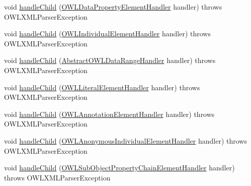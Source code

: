 \begin{DoxyCompactItemize}
\item 
void \hyperlink{interfaceorg_1_1coode_1_1owlapi_1_1owlxmlparser_1_1_o_w_l_element_handler_3_01_o_01_4_a2687058ae777468f56b4913be346c39a}{handle\-Child} (\hyperlink{classorg_1_1coode_1_1owlapi_1_1owlxmlparser_1_1_o_w_l_data_property_element_handler}{O\-W\-L\-Data\-Property\-Element\-Handler} handler)  throws O\-W\-L\-X\-M\-L\-Parser\-Exception
\item 
void \hyperlink{interfaceorg_1_1coode_1_1owlapi_1_1owlxmlparser_1_1_o_w_l_element_handler_3_01_o_01_4_ab55fbdf434382af884e015cf8f259cb0}{handle\-Child} (\hyperlink{classorg_1_1coode_1_1owlapi_1_1owlxmlparser_1_1_o_w_l_individual_element_handler}{O\-W\-L\-Individual\-Element\-Handler} handler)  throws O\-W\-L\-X\-M\-L\-Parser\-Exception
\item 
void \hyperlink{interfaceorg_1_1coode_1_1owlapi_1_1owlxmlparser_1_1_o_w_l_element_handler_3_01_o_01_4_afdf78ae02c51418dc0886358ac7597ba}{handle\-Child} (\hyperlink{classorg_1_1coode_1_1owlapi_1_1owlxmlparser_1_1_abstract_o_w_l_data_range_handler}{Abstract\-O\-W\-L\-Data\-Range\-Handler} handler)  throws O\-W\-L\-X\-M\-L\-Parser\-Exception
\item 
void \hyperlink{interfaceorg_1_1coode_1_1owlapi_1_1owlxmlparser_1_1_o_w_l_element_handler_3_01_o_01_4_a82f7dcdcb37732ff8dfe15d353719131}{handle\-Child} (\hyperlink{classorg_1_1coode_1_1owlapi_1_1owlxmlparser_1_1_o_w_l_literal_element_handler}{O\-W\-L\-Literal\-Element\-Handler} handler)  throws O\-W\-L\-X\-M\-L\-Parser\-Exception
\item 
void \hyperlink{interfaceorg_1_1coode_1_1owlapi_1_1owlxmlparser_1_1_o_w_l_element_handler_3_01_o_01_4_a71615ff43726efed08545715caa2e727}{handle\-Child} (\hyperlink{classorg_1_1coode_1_1owlapi_1_1owlxmlparser_1_1_o_w_l_annotation_element_handler}{O\-W\-L\-Annotation\-Element\-Handler} handler)  throws O\-W\-L\-X\-M\-L\-Parser\-Exception
\item 
void \hyperlink{interfaceorg_1_1coode_1_1owlapi_1_1owlxmlparser_1_1_o_w_l_element_handler_3_01_o_01_4_a849030b291376cfdbde92ae9d918bcb9}{handle\-Child} (\hyperlink{classorg_1_1coode_1_1owlapi_1_1owlxmlparser_1_1_o_w_l_anonymous_individual_element_handler}{O\-W\-L\-Anonymous\-Individual\-Element\-Handler} handler)  throws O\-W\-L\-X\-M\-L\-Parser\-Exception
\item 
void \hyperlink{interfaceorg_1_1coode_1_1owlapi_1_1owlxmlparser_1_1_o_w_l_element_handler_3_01_o_01_4_aa4b4b69305376abbe3557e6b24c5644a}{handle\-Child} (\hyperlink{classorg_1_1coode_1_1owlapi_1_1owlxmlparser_1_1_o_w_l_sub_object_property_chain_element_handler}{O\-W\-L\-Sub\-Object\-Property\-Chain\-Element\-Handler} handler)  throws O\-W\-L\-X\-M\-L\-Parser\-Exception

\end{DoxyCompactItemize}
